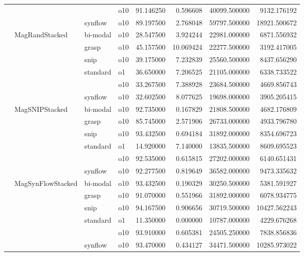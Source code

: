 \begin{longtable}{llllrrrr}
      &     &         & o10 &  91.146250 &   0.596608 &     40099.500000 &   9132.176192 \\
      &     & synflow & o10 &  89.197500 &   2.768048 &     59797.500000 &  18921.500672 \\
      & MagRandStacked & bi-modal & o10 &  28.547500 &   3.924244 &     22981.000000 &   6871.556932 \\
      &     & grasp & o10 &  45.157500 &  10.069424 &     22277.500000 &   3192.417005 \\
      &     & snip & o10 &  39.175000 &   7.232839 &     25560.500000 &   8437.656290 \\
      &     & standard & o1 &  36.650000 &   7.206525 &     21105.000000 &   6338.733522 \\
      &     &         & o10 &  33.267500 &   7.388928 &     23684.500000 &   4669.856743 \\
      &     & synflow & o10 &  32.602500 &   8.077625 &     19698.000000 &   3905.205415 \\
      & MagSNIPStacked & bi-modal & o10 &  92.735000 &   0.167829 &     21808.500000 &   4682.176809 \\
      &     & grasp & o10 &  85.745000 &   2.571906 &     26733.000000 &   4933.796780 \\
      &     & snip & o10 &  93.432500 &   0.694184 &     31892.000000 &   8354.696723 \\
      &     & standard & o1 &  14.920000 &   7.140000 &     13835.500000 &   8609.695523 \\
      &     &         & o10 &  92.535000 &   0.615815 &     27202.000000 &   6140.651431 \\
      &     & synflow & o10 &  92.277500 &   0.819649 &     36582.000000 &   9473.335632 \\
      & MagSynFlowStacked & bi-modal & o10 &  93.432500 &   0.190329 &     30250.500000 &   5381.591927 \\
      &     & grasp & o10 &  91.070000 &   0.551966 &     31892.000000 &   6078.934775 \\
      &     & snip & o10 &  94.167500 &   0.906656 &     30719.500000 &  10427.562243 \\
      &     & standard & o1 &  11.350000 &   0.000000 &     10787.000000 &   4229.676268 \\
      &     &         & o10 &  93.910000 &   0.605381 &     24505.250000 &   7838.856836 \\
      &     & synflow & o10 &  93.470000 &   0.434127 &     34471.500000 &  10285.973022 \\

\end{longtable}
